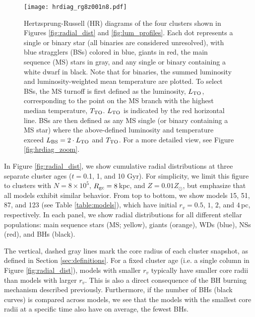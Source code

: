 \documentclass[twocolumn,tighten]{aastex63}
\begin{document}
\begin{figure*}
\texttt{[image: hrdiag\_rg8z001n8.pdf]}
\caption{\footnotesize Hertzsprung-Russell (HR) diagrams of the four clusters shown in Figures \ref{fig:radial_dist} and \ref{fig:lum_profiles}. Each dot represents a single or binary star (all binaries are considered unresolved), with blue stragglers (BSs) colored in blue, giants in red, the main sequence (MS) stars in gray, and any single or binary containing a white dwarf in black. Note that for binaries, the summed luminosity and luminosity-weighted mean temperature are plotted. To select BSs, the MS turnoff is first defined as the luminosity, $L_{\rm{TO}}$, corresponding to the point on the MS branch with the highest median temperature, $T_{\rm{TO}}$. $L_{\rm{TO}}$ is indicated by the red horizontal line. BSs are then defined as any MS single (or binary containing a MS star) where the above-defined luminosity and temperature exceed $L_{\rm{BS}} = 2\cdot L_{\rm{TO}}$ and $T_{\rm{TO}}$. For a more detailed view, see Figure \ref{fig:hrdiag_zoom}.}
\label{fig:hrdiag_multi}
\end{figure*}

In Figure \ref{fig:radial_dist}, we show cumulative radial distributions at three separate cluster ages ($t=$0.1, 1, and 10 Gyr). For simplicity, we limit this figure to clusters with $N=8\times10^5$, $R_{\rm{gc}}=8\,$kpc, and $Z=0.01Z_{\odot}$, but emphasize that all models exhibit similar behavior.
From top to bottom, we show models 15, 51, 87, and 123 (see Table \ref{table:models}), which have initial $r_v=0.5$, $1$, $2$, and $4\,$pc, respectively. In each panel, we show radial distributions for all different stellar populations: main sequence stars (MS; yellow), giants (orange), WDs (blue), NSs (red), and BHs (black).

The vertical, dashed gray lines mark the core radius of each cluster snapshot, as defined in Section \ref{sec:definitions}. For a fixed cluster age (i.e. a single column in Figure \ref{fig:radial_dist}), models with smaller $r_v$ typically have smaller core radii than models with larger $r_v$. This is also a direct consequence of the BH burning mechanism described previously. Furthermore, if the number of BHs (black curves) is compared across models, we see that the models with the smallest core radii at a specific time also have on average, the fewest BHs.
\end{document}
